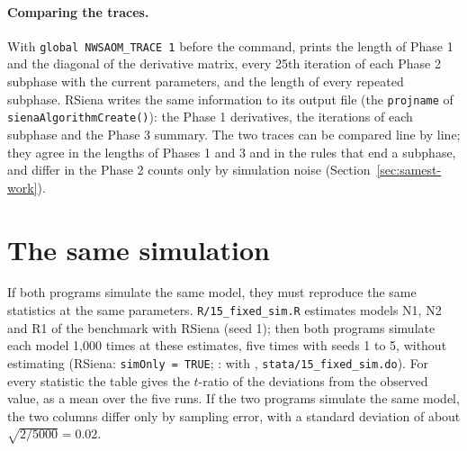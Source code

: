 \paragraph{Comparing the traces.} With \texttt{global NWSAOM\_TRACE 1} before the
command, \nwsaom{} prints the length of Phase 1 and the diagonal of the derivative
matrix, every 25th iteration of each Phase 2 subphase with the current parameters,
and the length of every repeated subphase. RSiena writes the same information to
its output file (the \texttt{projname} of \texttt{sienaAlgorithmCreate()}): the
Phase 1 derivatives, the iterations of each subphase and the Phase 3 summary. The
two traces can be compared line by line; they agree in the lengths of Phases 1 and
3 and in the rules that end a subphase, and differ in the Phase 2 counts only by
simulation noise (Section~\ref{sec:samest-work}).

\section{The same simulation}\label{sec:samest-fixed}

If both programs simulate the same model, they must reproduce the same statistics
at the same parameters. \texttt{R/15\_fixed\_sim.R} estimates models N1, N2 and R1
of the benchmark with RSiena (seed 1); then both programs simulate each model 1,000
times at these estimates, five times with seeds 1 to 5, without estimating
(RSiena: \texttt{simOnly = TRUE}; \nwsaom{}:  with ,
\texttt{stata/15\_fixed\_sim.do}). For every statistic the table gives the
$t$-ratio of the deviations from the observed value, as a mean over the five runs.
If the two programs simulate the same model, the two columns differ only by
sampling error, with a standard deviation of about $\sqrt{2/5000}=0.02$.

